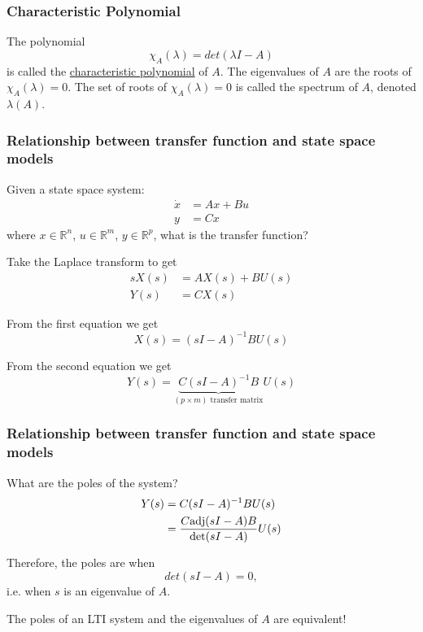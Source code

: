 \documentclass{beamer}
\begin{document}
\begin{frame}\frametitle{Characteristic Polynomial}
	\begin{definition}
		The polynomial
		\[
			\chi_A(\lambda ) = det(\lambda I - A)
		\]
		is called the \underline{characteristic polynomial} of $A$.  The eigenvalues of $A$ are the roots of $\chi_A(\lambda )=0$.  The set of roots of $\chi_A(\lambda )=0$ is called the spectrum of $A$, denoted $\lambda (A)$.
	\end{definition}
\end{frame}

\begin{frame}\frametitle{Relationship between transfer function and state space models}

	Given a state space system:
	\begin{align*}
		\dot{x} &= Ax + Bu \\ 
		y &= Cx
	\end{align*}
	where $x\in \mathbb{R}^n$, $u \in \mathbb{R}^m$, $y \in \mathbb{R}^p$, what is the transfer function?
	
	Take the Laplace transform to get
	\begin{align*}
		sX(s) &= AX(s) + BU(s)\\
		Y(s) &= CX(s)
	\end{align*}
	
	From the first equation we get 
	\[ 
		X(s) = (sI - A)^{-1}BU(s) 
	\]
	
	From the second equation we get
	\[ 
		Y(s) = \underbrace{C(sI-A)^{-1}B}_{(p\times m) \text{ transfer matrix}}U(s) 
	\]
	
\end{frame}

\begin{frame}\frametitle{Relationship between transfer function and state space models}
	What are the poles of the system?
	\begin{align*}
		Y(s) &= C(sI-A)^{-1}BU(s) \\
		     &= \frac{C \mathrm{adj}(sI-A)B}{\det(sI-A)}U(s) 
	\end{align*}
	
	Therefore, the poles are when 
	\[
		det(sI-A) = 0,
	\]
	i.e. when $s$ is an eigenvalue of $A$.

	\vfill
	
	{\color{blue} 
		The poles of an LTI system and the eigenvalues of $A$ are equivalent!
	}
\end{frame}
\end{document}
